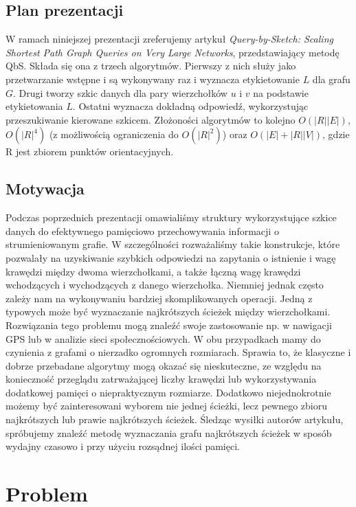 \documentclass{article}
\theoremstyle{definition}
\begin{document}
    \subsection{Plan prezentacji}
        W ramach niniejszej prezentacji zreferujemy artykuł \textit{Query-by-Sketch: Scaling Shortest Path Graph Queries on Very Large Networks}, przedstawiający metodę QbS. Składa się ona z trzech algorytmów. Pierwszy z nich służy jako przetwarzanie wstępne i są wykonywany raz i wyznacza etykietowanie $L$ dla grafu $G$. Drugi tworzy szkic danych dla pary wierzchołków $u$ i $v$ na podstawie etykietowania $L$. Ostatni wyznacza dokładną odpowiedź, wykorzystując przeszukiwanie kierowane szkicem. Złożoności algorytmów to kolejno $O(|R||E|)$, $O(|R|^4)$ (z możliwością ograniczenia do $O(|R|^2)$) oraz $O(|E| + |R||V|)$, gdzie R jest zbiorem punktów orientacyjnych.

    \subsection{Motywacja}
        Podczas poprzednich prezentacji omawialiśmy struktury wykorzystujące szkice danych do efektywnego pamięciowo przechowywania informacji o strumieniowanym grafie. W szczególności rozważaliśmy takie konstrukcje, które pozwalały na uzyskiwanie szybkich odpowiedzi na zapytania o istnienie i wagę krawędzi między dwoma wierzchołkami, a także łączną wagę krawędzi wchodzących i wychodzących z danego wierzchołka. Niemniej jednak często zależy nam na wykonywaniu bardziej skomplikowanych operacji. Jedną z typowych może być wyznaczanie najkrótszych ścieżek między wierzchołkami. Rozwiązania tego problemu mogą znaleźć swoje zastosowanie np. w nawigacji GPS lub w analizie sieci społecznościowych. W obu przypadkach mamy do czynienia z grafami o nierzadko ogromnych rozmiarach. Sprawia to, że klasyczne i dobrze przebadane algorytmy mogą okazać się nieskuteczne, ze względu na konieczność przeglądu zatrważającej liczby krawędzi lub wykorzystywania dodatkowej pamięci o niepraktycznym rozmiarze. Dodatkowo niejednokrotnie możemy być zainteresowani wyborem nie jednej ścieżki, lecz pewnego zbioru najkrótszych lub prawie najkrótszych ścieżek. Śledząc wysiłki autorów artykułu, spróbujemy znaleźć metodę wyznaczania grafu najkrótszych ścieżek w sposób wydajny czasowo i przy użyciu rozsądnej ilości pamięci. 
    
    \section{Problem}
    
\end{document}
